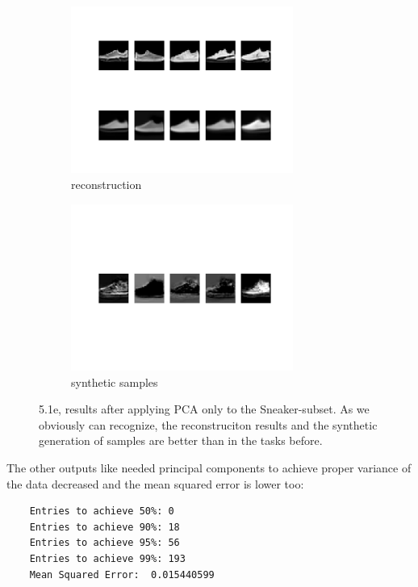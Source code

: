 \documentclass [a4paper, 11pt] {article}
\begin{document}
\begin{enumerate}
\begin{figure}[!h]
	\centering
	\begin{subfigure}{.7\textwidth}
		\centering
		\includegraphics[width=0.8\textwidth]{pca/sneaker/recon.png}
		\caption{reconstruction}
		\label{fig:sfig3}
	\end{subfigure}
	\begin{subfigure}{.7\textwidth}
		\centering
		\includegraphics[width=0.8\textwidth]{pca/sneaker/samples.png}
		\caption{synthetic samples}
		\label{fig:sfig4}
	\end{subfigure}
	\caption{ 5.1e, results after applying PCA only to the Sneaker-subset. As we obviously can recognize, the reconstruciton results and the synthetic generation of samples are better than in the tasks before.}
\end{figure}

The other outputs like needed principal components to achieve proper variance of the data decreased and the mean squared error is lower too:
\begin{lstlisting}
	Entries to achieve 50%: 0
	Entries to achieve 90%: 18
	Entries to achieve 95%: 56
	Entries to achieve 99%: 193
	Mean Squared Error:  0.015440599
\end{lstlisting}

\end{enumerate}
\end{document}
